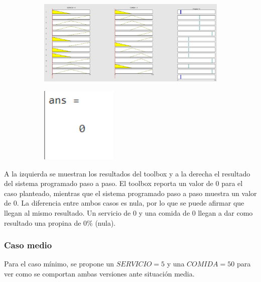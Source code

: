\documentclass[11pt, letterpaper]{article}
\begin{document}
\begin{figure}[h]
	\centering
	\begin{subfigure}{0.40\textwidth} %
		\centering
		\includegraphics[width=1.4\textwidth]{IMG/RP11.png}
		\label{fig:G3}
	\end{subfigure}
	\hfill
	\begin{subfigure}{0.42\textwidth} %
		\centering
		\includegraphics[width=0.4\textwidth]{IMG/M11.png}
		\label{fig:G4}
	\end{subfigure}
	\label{fig:comparacion2}
\end{figure}

A la izquierda se muestran los resultados del toolbox y a la derecha el resultado del sistema programado paso a paso. El toolbox reporta un valor de 0 para el caso planteado, mientras que el sistema programado paso a paso muestra un valor de 0. La diferencia entre ambos casos es nula, por lo que se puede afirmar que llegan al mismo resultado. Un servicio de 0 y una comida de 0 llegan a dar como resultado una propina de 0\% (nula).

\newpage

\subsubsection{Caso medio}
Para el caso mínimo, se propone un $SERVICIO = 5$ y una $COMIDA = 50$ para ver como se comportan ambas versiones ante situación media.
\end{document}
